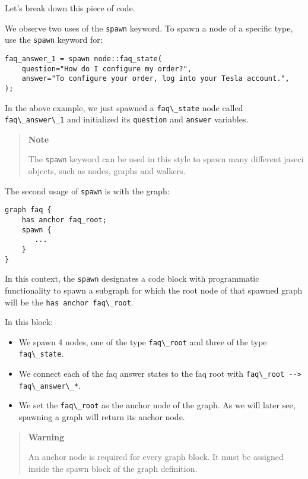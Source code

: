 Let's break down this piece of code.

We observe two uses of the \passthrough{\lstinline!spawn!} keyword. To
spawn a node of a specific type, use the \passthrough{\lstinline!spawn!}
keyword for:

\begin{lstlisting}
faq_answer_1 = spawn node::faq_state(
    question="How do I configure my order?",
    answer="To configure your order, log into your Tesla account.",
);
\end{lstlisting}

In the above example, we just spawned a
\passthrough{\lstinline!faq\_state!} node called
\passthrough{\lstinline!faq\_answer\_1!} and initialized its
\passthrough{\lstinline!question!} and \passthrough{\lstinline!answer!}
variables.

\begin{quote}
\textbf{Note}

The \passthrough{\lstinline!spawn!} keyword can be used in this style to
spawn many different jaseci objects, such as nodes, graphs and walkers.
\end{quote}

The second usage of \passthrough{\lstinline!spawn!} is with the graph:

\begin{lstlisting}
graph faq {
    has anchor faq_root;
    spawn {
       ...
    }
}
\end{lstlisting}

In this context, the \passthrough{\lstinline!spawn!} designates a code
block with programmatic functionality to spawn a subgraph for which the
root node of that spawned graph will be the
\passthrough{\lstinline!has anchor faq\_root!}.

In this block:

\begin{itemize}
\tightlist
\item
  We spawn 4 nodes, one of the type \passthrough{\lstinline!faq\_root!}
  and three of the type \passthrough{\lstinline!faq\_state!}.
\item
  We connect each of the faq answer states to the faq root with
  \passthrough{\lstinline!faq\_root --> faq\_answer\_*!}.
\item
  We set the \passthrough{\lstinline!faq\_root!} as the anchor node of
  the graph. As we will later see, spawning a graph will return its
  anchor node.
\end{itemize}

\begin{quote}
\textbf{Warning}

An anchor node is required for every graph block. It must be assigned
inside the spawn block of the graph definition.
\end{quote}

